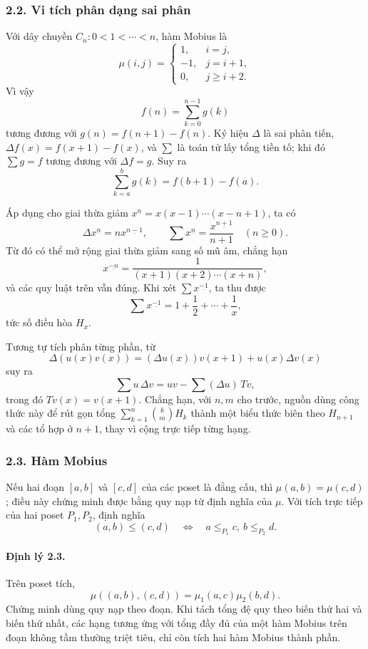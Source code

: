 \documentclass[11pt]{article}
\begin{document}
\subsubsection*{2.2. Vi tích phân dạng sai phân}

Với dây chuyền \(C_n:0<1<\cdots<n\), hàm Mobius là
\[
\mu(i,j)=
\begin{cases}
1,&i=j,\\
-1,&j=i+1,\\
0,&j\ge i+2.
\end{cases}
\]
Vì vậy
\[
f(n)=\sum_{k=0}^{n-1}g(k)
\]
tương đương với \(g(n)=f(n+1)-f(n)\). Ký hiệu \(\Delta\) là sai phân tiến,
\(\Delta f(x)=f(x+1)-f(x)\), và \(\sum\) là toán tử lấy tổng tiền tố; khi đó
\(\sum g=f\) tương đương với \(\Delta f=g\). Suy ra
\[
\sum_{k=a}^b g(k)=f(b+1)-f(a).
\]

Áp dụng cho giai thừa giảm \(x^{\underline n}=x(x-1)\cdots(x-n+1)\), ta có
\[
\Delta x^{\underline n}=n x^{\underline{n-1}},
\qquad
\sum x^{\underline n}=\frac{x^{\underline{n+1}}}{n+1}\quad(n\ge0).
\]
Từ đó có thể mở rộng giai thừa giảm sang số mũ âm, chẳng hạn
\[
x^{\underline{-n}}=\frac1{(x+1)(x+2)\cdots(x+n)},
\]
và các quy luật trên vẫn đúng. Khi xét \(\sum x^{\underline{-1}}\), ta thu
được
\[
\sum x^{\underline{-1}}=1+\frac12+\cdots+\frac1x,
\]
tức số điều hòa \(H_x\).

Tương tự tích phân từng phần, từ
\[
\Delta(u(x)v(x))=(\Delta u(x))v(x+1)+u(x)\Delta v(x)
\]
suy ra
\[
\sum u\,\Delta v=uv-\sum(\Delta u)\,Tv,
\]
trong đó \(Tv(x)=v(x+1)\). Chẳng hạn, với \(n,m\) cho trước, nguồn dùng công
thức này để rút gọn tổng \(\sum_{k=1}^n \binom{k}{m}H_k\) thành một biểu thức
biên theo \(H_{n+1}\) và các tổ hợp ở \(n+1\), thay vì cộng trực tiếp từng
hạng.

\subsubsection*{2.3. Hàm Mobius}

Nếu hai đoạn \([a,b]\) và \([c,d]\) của các poset là đẳng cấu, thì
\(\mu(a,b)=\mu(c,d)\); điều này chứng minh được bằng quy nạp từ định nghĩa của
\(\mu\). Với tích trực tiếp của hai poset \(P_1,P_2\), định nghĩa
\[
(a,b)\le (c,d)\quad\Longleftrightarrow\quad a\le_{P_1}c,\ b\le_{P_2}d.
\]

\paragraph{Định lý 2.3.}
Trên poset tích,
\[
\mu((a,b),(c,d))=\mu_1(a,c)\mu_2(b,d).
\]
Chứng minh dùng quy nạp theo đoạn. Khi tách tổng đệ quy theo biến thứ hai và
biến thứ nhất, các hạng tương ứng với tổng đầy đủ của một hàm Mobius trên đoạn
không tầm thường triệt tiêu, chỉ còn tích hai hàm Mobius thành phần.
\end{document}
